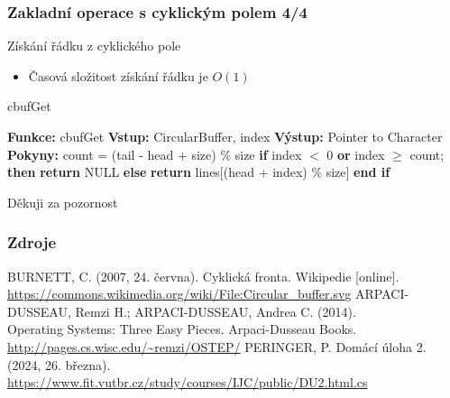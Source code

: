 \documentclass[]{fitthesispresn}
\begin{document}
    \begin{frame}
        \frametitle{Zakladní operace s cyklickým polem 4/4}
        Získání řádku z cyklického pole
        \begin{itemize}
            \item Časová složitost získání řádku je $O(1)$
        \end{itemize}
        \begin{algorithm}[H]
            \caption{cbufGet}
            \label{alg:cbufGet}
            \begin{algorithmic}[1]
                \State \textbf{Funkce:} cbufGet
                \State \textbf{Vstup:} CircularBuffer, index
                \State \textbf{Výstup:} Pointer to Character
                \State \textbf{Pokyny:}
                \State \hspace{\algorithmicindent} count = (tail - head + size) \% size
                \State \hspace{\algorithmicindent} \textbf{if} index $<$ 0 \textbf{or} index $\geq$ count; \textbf{then}
                \State \hspace{\algorithmicindent} \hspace{\algorithmicindent} \textbf{return} NULL
                \State \hspace{\algorithmicindent} \textbf{else}
                \State \hspace{\algorithmicindent} \hspace{\algorithmicindent} \textbf{return} lines[(head + index) \% size]
                \State \hspace{\algorithmicindent} \textbf{end if}
            \end{algorithmic}
        \end{algorithm}
    \end{frame}

    \begin{frame}[s]
        \vfill
        \centering \Large Děkuji za pozornost
        \vfill
    \end{frame}

    \begin{frame}
        \frametitle{Zdroje}
        \centering
        \begin{thebibliography}{}
             BURNETT, C. (2007, 24. června). Cyklická fronta. Wikipedie [online].\\\url{https://commons.wikimedia.org/wiki/File:Circular_buffer.svg}
             ARPACI-DUSSEAU, Remzi H.; ARPACI-DUSSEAU, Andrea C. (2014).\\Operating Systems: Three Easy Pieces. Arpaci-Dusseau Books. \url{http://pages.cs.wisc.edu/~remzi/OSTEP/}
             PERINGER, P. Domácí úloha 2. (2024, 26. března).\\ \url{https://www.fit.vutbr.cz/study/courses/IJC/public/DU2.html.cs}
        \end{thebibliography}
    \end{frame}
\end{document}
